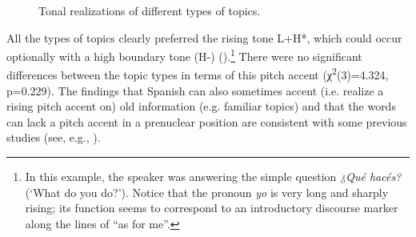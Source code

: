 \documentclass[output=paper]{langsci/langscibook}
\begin{document}
\begin{figure}
\caption{Tonal realizations of different types of topics.\label{fig:pes:13}} 
\end{figure}

All the types of topics clearly preferred the rising tone L+H*, which could occur optionally with a high boundary tone (H-) ().\footnote{In this example, the speaker was answering the simple question \textit{¿Qué hacés?} (‘What do you do?’). Notice that the pronoun \textit{yo} is very long and sharply rising; its function seems to correspond to an introductory discourse marker along the lines of ``as for me''.} There were no significant differences between the topic types in terms of this pitch accent (χ\textsuperscript{2}(3)=4.324, p=0.229). The findings that Spanish can also sometimes accent (i.e. realize a rising pitch accent on) old information (e.g. familiar topics) and that the words can lack a pitch accent in a prenuclear position are consistent with some previous studies (see, e.g., \citealt{Cruttenden1993,Face2003}).
\end{document}
